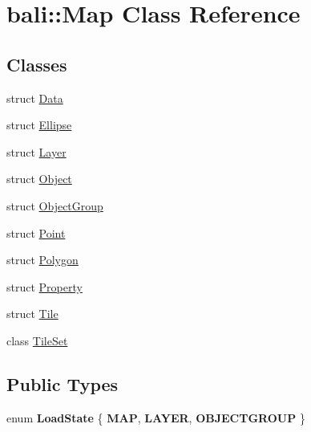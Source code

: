 \hypertarget{classbali_1_1_map}{\section{bali\-:\-:Map Class Reference}
\label{classbali_1_1_map}
}
\subsection*{Classes}
\begin{DoxyCompactItemize}
\item 
struct \hyperlink{structbali_1_1_map_1_1_data}{Data}
\item 
struct \hyperlink{structbali_1_1_map_1_1_ellipse}{Ellipse}
\item 
struct \hyperlink{structbali_1_1_map_1_1_layer}{Layer}
\item 
struct \hyperlink{structbali_1_1_map_1_1_object}{Object}
\item 
struct \hyperlink{structbali_1_1_map_1_1_object_group}{Object\-Group}
\item 
struct \hyperlink{structbali_1_1_map_1_1_point}{Point}
\item 
struct \hyperlink{structbali_1_1_map_1_1_polygon}{Polygon}
\item 
struct \hyperlink{structbali_1_1_map_1_1_property}{Property}
\item 
struct \hyperlink{structbali_1_1_map_1_1_tile}{Tile}
\item 
class \hyperlink{classbali_1_1_map_1_1_tile_set}{Tile\-Set}
\end{DoxyCompactItemize}
\subsection*{Public Types}
\begin{DoxyCompactItemize}
\item 
enum {\bfseries Load\-State} \{ {\bfseries M\-A\-P}, 
{\bfseries L\-A\-Y\-E\-R}, 
{\bfseries O\-B\-J\-E\-C\-T\-G\-R\-O\-U\-P}
 \}
\end{DoxyCompactItemize}

